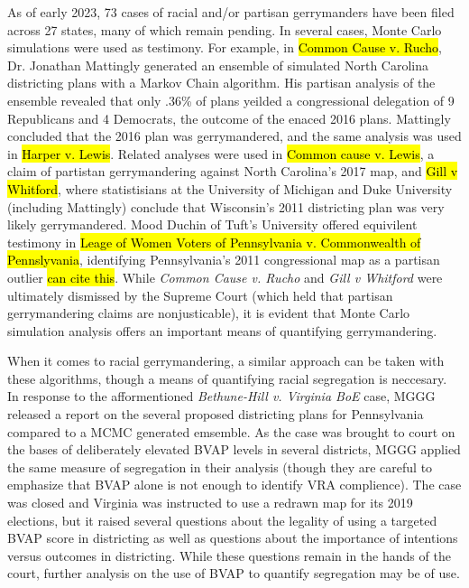 \documentclass{article}
\begin{document}
\par
As of early 2023, 73 cases of racial and/or partisan gerrymanders have been filed across 27 states, many of which remain pending. In several cases, Monte Carlo simulations were used as testimony. For example, in \hl{Common Cause v. Rucho}, Dr. Jonathan Mattingly generated an ensemble of simulated North Carolina districting plans with a Markov Chain algorithm. His partisan analysis of the ensemble revealed that only .36\% of plans yeilded a congressional delegation of 9 Republicans and 4 Democrats, the outcome of the enaced 2016 plans. Mattingly concluded that the 2016 plan was gerrymandered,  and the same analysis was used in \hl{Harper v. Lewis}. Related analyses were used in \hl{Common cause v. Lewis}, a claim of partistan gerrymandering against North Carolina's 2017 map, and \hl{Gill v Whitford}, where statistisians at the University of Michigan and Duke University (including Mattingly) conclude that Wisconsin's 2011 districting plan was very likely gerrymandered. Mood Duchin of Tuft's University offered equivilent testimony in \hl{Leage of Women Voters of Pennsylvania v. Commonwealth of Pennslyvania}, identifying Pennsylvania's 2011 congressional map as a partisan outlier \hl{can cite this}. While \emph{Common Cause v. Rucho} and \emph{Gill v Whitford} were ultimately dismissed by the Supreme Court (which held that partisan gerrymandering claims are nonjusticable), it is evident that Monte Carlo simulation analysis offers an important means of quantifying gerrymandering.  
\par 
When it comes to racial gerrymandering, a similar approach can be taken with these algorithms, though a means of quantifying racial segregation is neccesary. In response to the afformentioned \emph{Bethune-Hill v. Virginia BoE} case, MGGG released a report on the several proposed districting plans for Pennsylvania compared to a MCMC generated emsemble. As the case was brought to court on the bases of deliberately elevated BVAP levels in several districts, MGGG applied the same measure of segregation in their analysis (though they are careful to emphasize that BVAP alone is not enough to identify VRA complience). The case was closed and Virginia was instructed to use a redrawn map for its 2019 elections, but it raised several questions about the legality of using a targeted BVAP score in districting as well as questions about the importance of intentions versus outcomes in districting. While these questions remain in the hands of the court, further analysis on the use of BVAP to quantify segregation may be of use.
\end{document}
